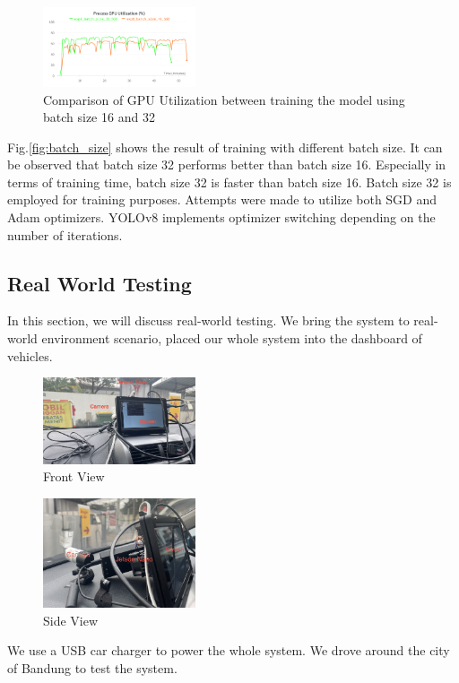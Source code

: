 \documentclass[conference]{IEEEtran}
\begin{document}
\begin{figure}[h!]
\centering
\includegraphics[width=0.4\textwidth,keepaspectratio]{gpu_utilization_comparison.png} 
\caption{Comparison of GPU Utilization between training the model using batch size 16 and 32}
\label{fig:gpu_utilization}
\end{figure}
Fig.\ref{fig:batch_size} shows the result of training with different batch size. It can be observed that batch size 32 performs better than batch size 16. Especially in terms of training time, batch size 32 is faster than batch size 16.
Batch size 32 is employed for training purposes. Attempts were made to utilize both SGD and Adam optimizers. YOLOv8 implements optimizer switching depending on the number of iterations.


\subsection{Real World Testing}
In this section, we will discuss real-world testing. We bring the system to real-world environment scenario, placed our whole system into the dashboard of vehicles.
\begin{figure}[h!]
\centering
\includegraphics[width=0.4\textwidth,keepaspectratio]{mounted_camera_front_view.jpg}
\caption{Front View}
\label{fig:front_view}
\end{figure}

\begin{figure}[h!]
\centering
\includegraphics[width=0.4\textwidth,keepaspectratio]{mounted_camera_side_view.jpg}
\caption{Side View}
\label{fig:side_view}
\end{figure}
We use a USB car charger to power the whole system. We drove around the city of Bandung to test the system. 
\end{document}
